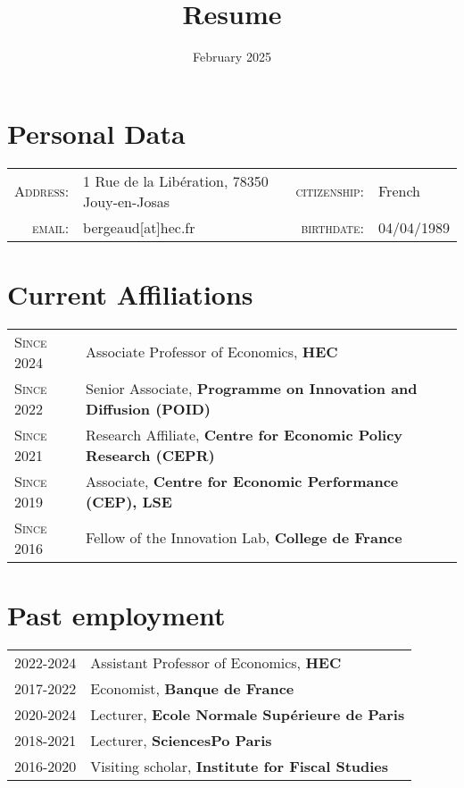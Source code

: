 \documentclass[12pt]{article}
\begin{document}
\title{\textbf{Resume}}
\date{February 2025}
\maketitle
\section*{Personal Data}

\begin{tabular}{r l r l }
    \textsc{Address:}   & 1 Rue de la Libération, 78350 Jouy-en-Josas  & \textsc{citizenship:} & French \\
    \textsc{email:}     & bergeaud[at]hec.fr &     \textsc{birthdate:} & 04/04/1989 \\ 
\end{tabular}

\section*{Current Affiliations}
\begin{tabular}{p{3cm}l}

\textsc{Since 2024} & Associate Professor of Economics, \textbf{HEC} \\
\textsc{Since 2022} & Senior Associate, \textbf{Programme on Innovation and Diffusion 
 (POID)} \\
\textsc{Since 2021} & Research Affiliate, \textbf{Centre for Economic Policy Research (CEPR)} \\
\textsc{Since 2019} & Associate, \textbf{Centre for Economic Performance (CEP), LSE} \\
\textsc{Since 2016} & Fellow of the Innovation Lab, \textbf{College de France} \\
\end{tabular}

\section*{Past employment}

\begin{tabular}{p{3cm}l}
\textsc{2022-2024} & Assistant Professor of Economics, \textbf{HEC} \\
\textsc{2017-2022} & Economist, \textbf{Banque de France} \\
\textsc{2020-2024} & Lecturer, \textbf{Ecole Normale Supérieure de Paris} \\
\textsc{2018-2021} & Lecturer, \textbf{SciencesPo Paris} \\
\textsc{2016-2020} & Visiting scholar, \textbf{Institute for Fiscal Studies}
\end{tabular}
\end{document}
